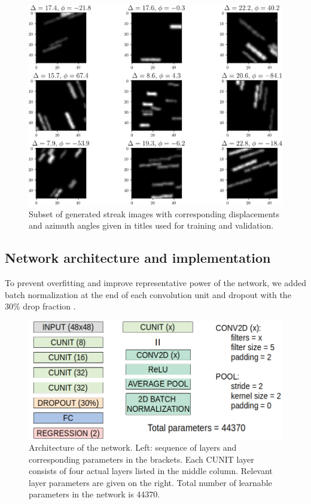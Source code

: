 \documentclass{svjour3}                     %
\begin{document}
\begin{figure}
\includegraphics[width=\textwidth]{figs/figure1.png}
\caption{Subset of generated streak images with corresponding displacements and azimuth angles given in titles used for training and validation.}
\label{fig:fig1}
\end{figure}

\subsection{Network architecture and implementation}


To prevent overfitting and improve representative power of the network, we added batch normalization at the end of each convolution unit \cite{ioffe2015batch} and dropout with the 30\% drop fraction \cite{srivastava2014dropout}.

\begin{figure}
\includegraphics[width=\textwidth]{figs/figure2.png}
\caption{Architecture of the network. Left: sequence of layers and corresponding parameters in the brackets. Each CUNIT layer consists of four actual layers listed in the middle column. Relevant layer parameters are given on the right. Total number of learnable parameters in the network is 44370.}
\label{fig:fig2}
\end{figure}
\end{document}
